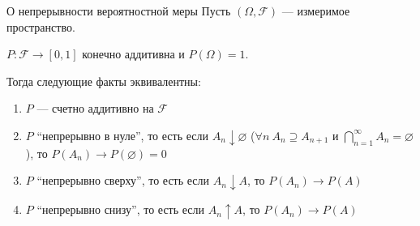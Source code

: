 \begin{thrm}{О непрерывности вероятностной меры}{}
    Пусть \( (\Omega, \mathcal{F}) \) --- измеримое пространство.

    \( P : \mathcal{F} \to [0, 1] \) конечно аддитивна и \( P(\Omega) = 1 \).

    Тогда следующие факты эквивалентны:
    \begin{enumerate}
        \item
            \( P \) --- счетно аддитивно на \( \mathcal{F} \)
        \item
            \( P \) ``непрерывно в нуле'', то есть
            если \( A_n \downarrow \varnothing \)
            (\( \forall n \ A_n \supseteq A_{n + 1} \) и \( \bigcap\limits_{n = 1}^{\infty} A_n = \varnothing \)),
            то \( P(A_n) \to P(\varnothing) = 0 \)
        \item
            \( P \) ``непрерывно сверху'', то есть если \( A_n \downarrow A \),
            то \( P(A_n) \to P(A) \)
        \item
            \( P \) ``непрерывно снизу'', то есть если \( A_n \uparrow A \),
            то \( P(A_n) \to P(A) \)
    \end{enumerate}
\end{thrm}

